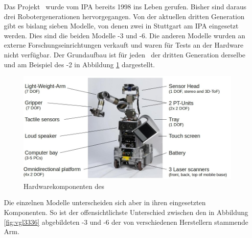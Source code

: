 Das Projekt \cob\ wurde vom \ac{IPA} bereits 1998 ins Leben gerufen. Bisher sind
daraus drei Robotergenerationen hervorgegangen. Von der aktuellen dritten
Generation gibt es bislang sieben Modelle, von denen zwei in Stuttgart am \ac{IPA}
eingesetzt werden. Dies sind die beiden Modelle -3 und -6. Die anderen
Modelle wurden an externe Forschungseinrichtungen verkauft und waren für Tests
an der Hardware nicht verfügbar. Der Grundaufbau ist für jeden \cob\ der dritten
Generation derselbe und am Beispiel des -2 in Abbildung \ref{setup} dargestellt.

\begin{figure}[Hht]
\centering
\includegraphics[width=\textwidth]{images/hw_setup_with_text}
\caption{Hardwarekomponenten des \cob\ \cite{cob_research}}
\label{setup}
\end{figure}

  Die einzelnen Modelle unterscheiden sich aber in ihren
eingesetzten Komponenten. So ist der offensichtlichste Unterschied zwischen
den in Abbildung \ref{fig:vgl3336} abgebildeten -3 und -6 der von verschiedenen Herstellern stammende Arm. 

